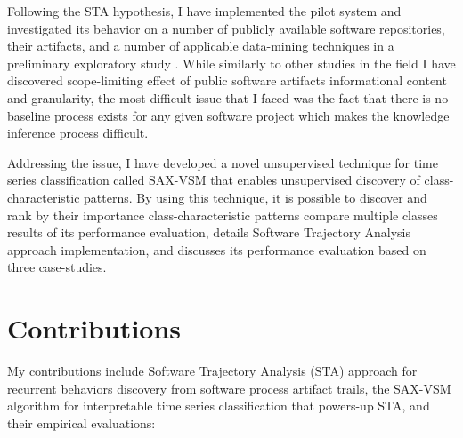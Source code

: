 Following the STA hypothesis, I have implemented the pilot system and investigated its behavior on a number 
of publicly available software repositories, their artifacts, and a number of applicable data-mining techniques 
in a preliminary exploratory study \cite{csdl2-10-09}. 
While similarly to other studies in the field I have discovered scope-limiting effect 
of public software artifacts informational content and granularity, the most difficult issue that I faced 
was the fact that there is no baseline process exists for any given software project which makes the 
knowledge inference process difficult. 

Addressing the issue, I have developed a novel unsupervised technique for time series classification 
called SAX-VSM that enables unsupervised discovery of class-characteristic patterns. 
By using this technique, it is possible to discover and rank by their importance class-characteristic 
patterns compare multiple classes 
results of its performance evaluation, details Software Trajectory Analysis approach implementation, 
and discusses its performance evaluation based on three case-studies.

\section{Contributions}\label{section_contributions}
My contributions include Software Trajectory Analysis (STA) approach for recurrent behaviors discovery
from software process artifact trails, the SAX-VSM algorithm for interpretable time series classification 
that powers-up STA, and their empirical evaluations: 

